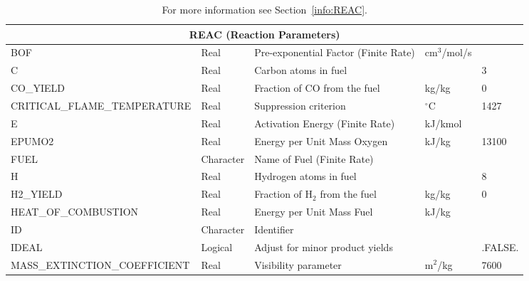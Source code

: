 \documentclass[11pt]{book}
\begin{document}
\begin{table}[H]
\caption{For more information see Section~\ref{info:REAC}.}\label{tbl:REAC}
\noindent
\begin{tabular*}{\textwidth}{@{\extracolsep{\fill}}|l|l|l|l|l|}
\hline
\multicolumn{5}{|c|}{{\ct REAC} (Reaction Parameters)} \\ \hline \hline
{\ct BOF}                                 & Real        & Pre-exponential Factor (Finite Rate)      &   cm$^3$/mol/s    &     \\ \hline
{\ct C}                                   & Real        & Carbon atoms in fuel                      &                   & 3    \\ \hline
{\ct CO\_YIELD}                           & Real        & Fraction of CO from the fuel              & kg/kg             & 0        \\ \hline
{\ct CRITICAL\_FLAME\_TEMPERATURE}        & Real        & Suppression criterion                     &   $^\circ$C       & 1427    \\ \hline
{\ct E}                                   & Real        & Activation Energy (Finite Rate)           &   kJ/kmol         &     \\ \hline
{\ct EPUMO2}                              & Real        & Energy per Unit Mass Oxygen               &   kJ/kg           & 13100    \\ \hline
{\ct FUEL}                                & Character   & Name of Fuel (Finite Rate)                &                   &     \\ \hline
{\ct H}                                   & Real        & Hydrogen atoms in fuel                    &                   & 8    \\ \hline
{\ct H2\_YIELD}                           & Real        & Fraction of H$_2$ from the fuel           & kg/kg             & 0        \\ \hline
{\ct HEAT\_OF\_COMBUSTION}                & Real        & Energy per Unit Mass Fuel                 &   kJ/kg           &         \\ \hline
{\ct ID}                                  & Character   & Identifier                                &                   &     \\ \hline
{\ct IDEAL}                               & Logical     & Adjust for minor product yields           &                   & {\ct .FALSE.}    \\ \hline
{\ct MASS\_EXTINCTION\_COEFFICIENT}       & Real        & Visibility parameter                      &  m$^2$/kg         & 7600    \\ \hline

\end{tabular*}
\end{table}
\end{document}
